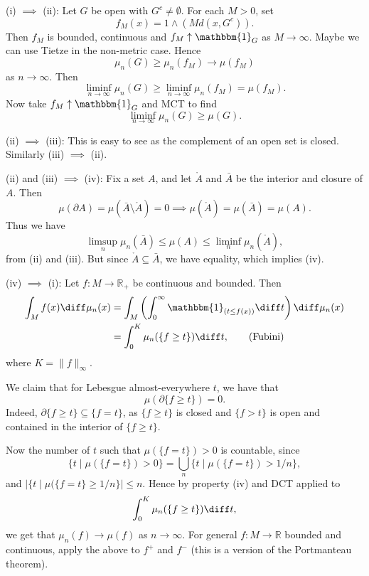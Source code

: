 \documentclass[12pt]{article}
\begin{document}
\begin{proofbox}
	

	(i) $\implies$ (ii): Let $G$ be open with $G^{c} \neq \emptyset$. For each $M > 0$, set
	\[
	f_M(x) = 1 \wedge(M d(x, G^{c})).
	\]
	Then $f_M$ is bounded, continuous and $f_M \uparrow \mathbbm{1}_{G}$ as $M \to \infty$. Maybe we can use Tietze in the non-metric case. Hence
	\[
	\mu_n(G) \geq \mu_n(f_M) \to \mu(f_M)
	\]
	as $n \to \infty$. Then
	\[
	\liminf_{n \to \infty} \mu_n(G) \geq \liminf_{n \to \infty} \mu_n(f_M) = \mu(f_M).
	\]
	Now take $f_M \uparrow \mathbbm{1}_{G}$ and MCT to find
	\[
	\liminf_{n \to \infty} \mu_n(G) \geq \mu(G).
	\]

	(ii) $\implies$ (iii): This is easy to see as the complement of an open set is closed. Similarly (iii) $\implies$ (ii).

	(ii) and (iii) $\implies$ (iv): Fix a set $A$, and let $\mathring A$ and $\bar{A}$ be the interior and closure of $A$. Then
	\[
	\mu(\partial A) = \mu(\bar{A} \setminus \mathring A) = 0 \implies \mu(\mathring A) = \mu(\bar{A}) = \mu(A).
	\]
	Thus we have
	\[
	\limsup_n \mu_n(\bar A) \leq \mu(A) \leq \liminf_n \mu_n(\mathring A),
	\]
	from (ii) and (iii). But since $\mathring A \subseteq \bar A$, we have equality, which implies (iv).

	(iv) $\implies$ (i): Let $f : M \to \mathbb{R}_+$ be continuous and bounded. Then
	\begin{align*}
		\int_M f(x) \diff \mu_n(x) &= \int_M \left( \int_0^\infty \mathbbm{1}_{(t \leq f(x))} \diff t \right) \diff \mu_n(x) \\
					   &= \int_0^K \mu_n(\{f \geq t\}) \diff t, \qquad (\text{Fubini})
	\end{align*}
	where $K = \|f\|_\infty$.

	We claim that for Lebesgue almost-everywhere $t$, we have that
	\[
		\mu(\partial\{f \geq t\}) = 0.
	\]
	Indeed, $\partial\{f \geq t\} \subseteq \{f = t\}$, as $\{f \geq t\}$ is closed and $\{f > t\}$ is open and contained in the interior of $\{f \geq t\}$.

	Now the number of $t$ such that $\mu(\{f = t\}) > 0$ is countable, since
	\[
	\{ t \mid \mu(\{f = t\}) > 0\} = \bigcup_n \{t \mid \mu(\{f = t\}) > 1/n\},
	\]
	and $|\{t \mid \mu(\{f = t\} \geq 1/n\}| \leq n$. Hence by property (iv) and DCT applied to
	\[
		\int_0^K \mu_n(\{f \geq t\}) \diff t,
	\]
	we get that $\mu_n(f) \to \mu(f)$ as $n \to \infty$. For general $f : M \to \mathbb{R}$ bounded and continuous, apply the above to $f^+$ and $f^-$ (this is a version of the Portmanteau theorem).
\end{proofbox}
\end{document}
